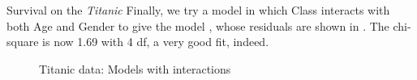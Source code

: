 \begin{Example}[titanic]{Survival on the \emph{Titanic}}
Finally, we try a model in which Class interacts with both
Age and Gender to give the model
, whose residuals are shown in .
The \LR{} chi-square is now 1.69 with 4 df, a very good fit, indeed.
%
\begin{figure}[htb]
 \begin{subfigmatrix}{2}
 \end{subfigmatrix}
 \caption[Titanic data: Models with interactions]{Titanic data: Models with interactions}\label{fig:mostitanic5-6}
\end{figure}


\end{Example}
